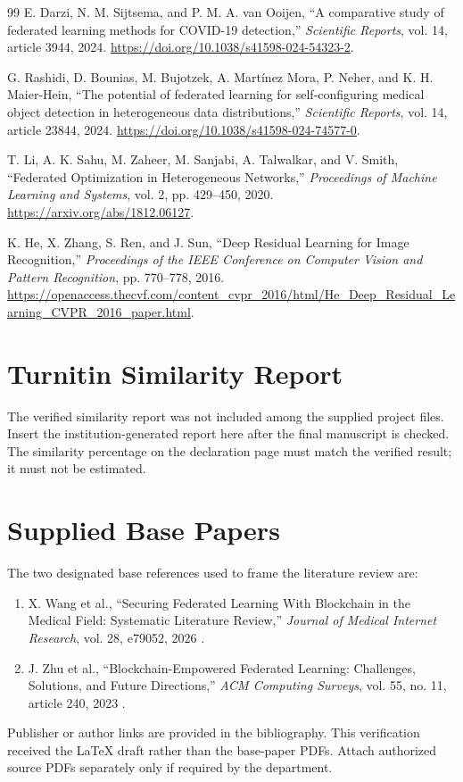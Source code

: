 \documentclass[12pt,a4paper]{report}
\begin{document}
\begin{thebibliography}{99}
E. Darzi, N. M. Sijtsema, and P. M. A. van Ooijen,
``A comparative study of federated learning methods for COVID-19 detection,''
\textit{Scientific Reports}, vol. 14, article 3944, 2024.
\url{https://doi.org/10.1038/s41598-024-54323-2}.

G. Rashidi, D. Bounias, M. Bujotzek, A. Mart\'{i}nez Mora, P. Neher,
and K. H. Maier-Hein, ``The potential of federated learning for self-configuring
medical object detection in heterogeneous data distributions,''
\textit{Scientific Reports}, vol. 14, article 23844, 2024.
\url{https://doi.org/10.1038/s41598-024-74577-0}.

T. Li, A. K. Sahu, M. Zaheer, M. Sanjabi, A. Talwalkar, and V. Smith,
``Federated Optimization in Heterogeneous Networks,''
\textit{Proceedings of Machine Learning and Systems}, vol. 2,
pp. 429--450, 2020. \url{https://arxiv.org/abs/1812.06127}.

K. He, X. Zhang, S. Ren, and J. Sun,
``Deep Residual Learning for Image Recognition,''
\textit{Proceedings of the IEEE Conference on Computer Vision and Pattern
Recognition}, pp. 770--778, 2016.
\url{https://openaccess.thecvf.com/content_cvpr_2016/html/He_Deep_Residual_Learning_CVPR_2016_paper.html}.
\end{thebibliography}

\appendix
\chapter{Turnitin Similarity Report}
The verified similarity report was not included among the supplied project files. Insert the institution-generated report here after the final manuscript is checked. The similarity percentage on the declaration page must match the verified result; it must not be estimated.

\chapter{Supplied Base Papers}
The two designated base references used to frame the literature review are:
\begin{enumerate}
    \item X. Wang et al., ``Securing Federated Learning With Blockchain in the Medical Field: Systematic Literature Review,'' \textit{Journal of Medical Internet Research}, vol. 28, e79052, 2026 \cite{wang2026bcfl}.
    \item J. Zhu et al., ``Blockchain-Empowered Federated Learning: Challenges, Solutions, and Future Directions,'' \textit{ACM Computing Surveys}, vol. 55, no. 11, article 240, 2023 \cite{zhu2023blockfed}.
\end{enumerate}
Publisher or author links are provided in the bibliography. This verification received the LaTeX draft rather than the base-paper PDFs. Attach authorized source PDFs separately only if required by the department.
\end{document}

